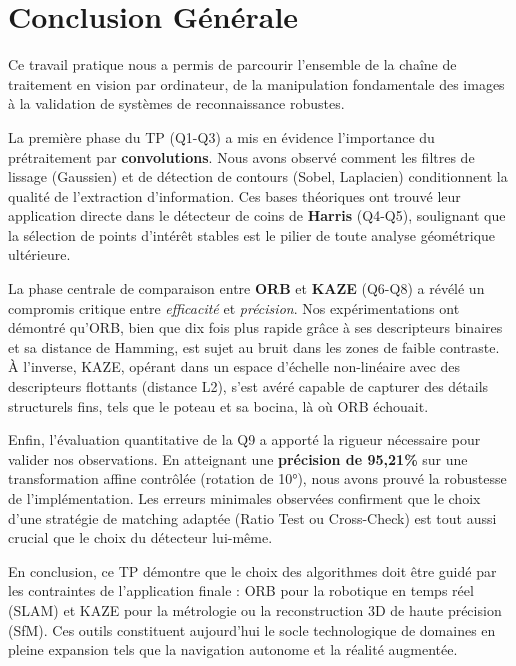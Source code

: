 \documentclass[11pt,a4paper]{article}
\begin{document}
\section{Conclusion Générale}

Ce travail pratique nous a permis de parcourir l'ensemble de la chaîne de traitement en vision par ordinateur, de la manipulation fondamentale des images à la validation de systèmes de reconnaissance robustes. 

La première phase du TP (Q1-Q3) a mis en évidence l'importance du prétraitement par \textbf{convolutions}. Nous avons observé comment les filtres de lissage (Gaussien) et de détection de contours (Sobel, Laplacien) conditionnent la qualité de l'extraction d'information. Ces bases théoriques ont trouvé leur application directe dans le détecteur de coins de \textbf{Harris} (Q4-Q5), soulignant que la sélection de points d'intérêt stables est le pilier de toute analyse géométrique ultérieure.

La phase centrale de comparaison entre \textbf{ORB} et \textbf{KAZE} (Q6-Q8) a révélé un compromis critique entre \textit{efficacité} et \textit{précision}. Nos expérimentations ont démontré qu'ORB, bien que dix fois plus rapide grâce à ses descripteurs binaires et sa distance de Hamming, est sujet au bruit dans les zones de faible contraste. À l'inverse, KAZE, opérant dans un espace d'échelle non-linéaire avec des descripteurs flottants (distance L2), s'est avéré capable de capturer des détails structurels fins, tels que le poteau et sa bocina, là où ORB échouait.

Enfin, l'évaluation quantitative de la Q9 a apporté la rigueur nécessaire pour valider nos observations. En atteignant une \textbf{précision de 95,21\%} sur une transformation affine contrôlée (rotation de 10°), nous avons prouvé la robustesse de l'implémentation. Les erreurs minimales observées confirment que le choix d'une stratégie de matching adaptée (Ratio Test ou Cross-Check) est tout aussi crucial que le choix du détecteur lui-même.

En conclusion, ce TP démontre que le choix des algorithmes doit être guidé par les contraintes de l'application finale : ORB pour la robotique en temps réel (SLAM) et KAZE pour la métrologie ou la reconstruction 3D de haute précision (SfM). Ces outils constituent aujourd'hui le socle technologique de domaines en pleine expansion tels que la navigation autonome et la réalité augmentée.
\end{document}
